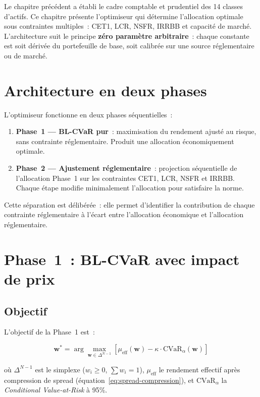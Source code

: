 \documentclass[12pt, a4paper, twoside, openright]{report}
\theoremstyle{definition}
\begin{document}
Le chapitre précédent a établi le cadre comptable et prudentiel des 14 classes d'actifs. Ce chapitre présente l'optimiseur qui détermine l'allocation optimale sous contraintes multiples~: CET1, LCR, NSFR, IRRBB et capacité de marché. L'architecture suit le principe \textbf{zéro paramètre arbitraire}~: chaque constante est soit dérivée du portefeuille de base, soit calibrée sur une source réglementaire ou de marché.

\section{Architecture en deux phases}
\label{sec:blcvar-archi}

L'optimiseur fonctionne en deux phases séquentielles~:

\begin{enumerate}
\item \textbf{Phase~1 --- BL-CVaR pur}~: maximisation du rendement ajusté au risque, sans contrainte réglementaire. Produit une allocation économiquement optimale.
\item \textbf{Phase~2 --- Ajustement réglementaire}~: projection séquentielle de l'allocation Phase~1 sur les contraintes CET1, LCR, NSFR et IRRBB. Chaque étape modifie minimalement l'allocation pour satisfaire la norme.
\end{enumerate}

Cette séparation est délibérée~: elle permet d'identifier la contribution de chaque contrainte réglementaire à l'écart entre l'allocation économique et l'allocation réglementaire.

\section{Phase~1~: BL-CVaR avec impact de prix}
\label{sec:blcvar-phase1}

\subsection{Objectif}

L'objectif de la Phase~1 est~:

\begin{equation}
\mathbf{w}^* = \arg\max_{\mathbf{w} \in \Delta^{N-1}} \left[ \mu_{\text{eff}}(\mathbf{w}) - \kappa \cdot \text{CVaR}_\alpha(\mathbf{w}) \right]
\label{eq:blcvar-obj}
\end{equation}

\noindent où $\Delta^{N-1}$ est le simplexe ($w_i \geq 0$, $\sum w_i = 1$), $\mu_{\text{eff}}$ le rendement effectif après compression de spread (équation~\ref{eq:spread-compression}), et $\text{CVaR}_\alpha$ la \textit{Conditional Value-at-Risk} à 95\%.
\end{document}
